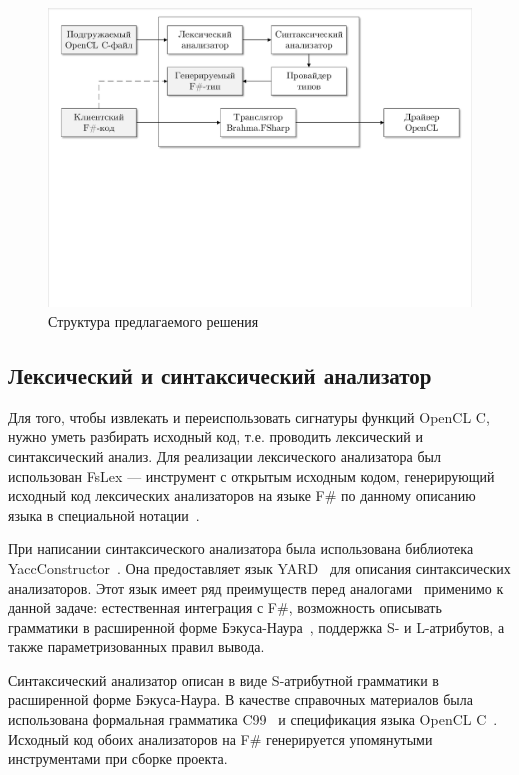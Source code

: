\begin{figure}[h]
\centering
\includegraphics[width=\textwidth]{Smirenko/courseworkpictures/architecture.pdf}
\caption{Структура предлагаемого решения}
\label{architecture}
\end{figure}

\subsection{Лексический и синтаксический анализатор}
Для того, чтобы извлекать и переиспользовать сигнатуры функций OpenCL C, нужно уметь разбирать исходный код, т.е. проводить лексический и синтаксический анализ. Для реализации лексического анализатора был использован FsLex --- инструмент с открытым исходным кодом, генерирующий исходный код лексических анализаторов на языке F\# по данному описанию языка в специальной нотации~\cite{FsLex}.

При написании синтаксического анализатора была использована библиотека YaccConstructor~\cite{YaccConstructorPaper, YaccConstructorPage}. Она предоставляет язык YARD~\cite{YARD} для описания синтаксических анализаторов. Этот язык имеет ряд преимуществ перед аналогами~\cite{ANTLR, Yacc} применимо к данной задаче: естественная интеграция с F\#, возможность описывать грамматики в расширенной форме Бэкуса-Наура~\cite{EBNF}, поддержка S- и L-атрибутов, а также параметризованных правил вывода.

Синтаксический анализатор описан в виде S-атрибутной грамматики в расширенной форме Бэкуса-Наура. В качестве справочных материалов была использована формальная грамматика C99~\cite{C99} и спецификация языка OpenCL C~\cite{OpenCL_C}. Исходный код обоих анализаторов на F\# генерируется упомянутыми инструментами при сборке проекта.

